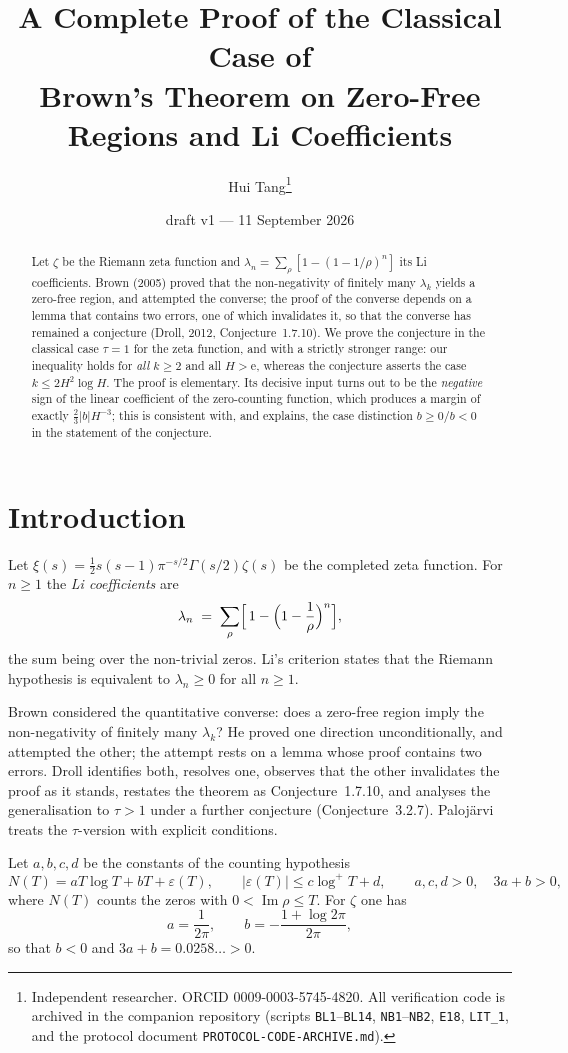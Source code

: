 \documentclass[11pt]{article}
\title{A Complete Proof of the Classical Case of\\ Brown's Theorem on Zero-Free Regions and Li Coefficients}
\author{Hui Tang\thanks{Independent researcher. ORCID 0009-0003-5745-4820. All verification code is archived
in the companion repository (scripts \texttt{BL1}--\texttt{BL14}, \texttt{NB1}--\texttt{NB2},
\texttt{E18}, \texttt{LIT\_1}, and the protocol document \texttt{PROTOCOL-CODE-ARCHIVE.md}).}}
\date{draft v1 --- 11 September 2026}
\theoremstyle{definition}
\newcommand{\e}{\mathrm{e}}
\DeclareMathOperator{\Imag}{Im}
\begin{document}
\maketitle

\begin{abstract}
Let $\zeta$ be the Riemann zeta function and $\lambda_n=\sum_\rho[1-(1-1/\rho)^n]$ its Li coefficients.
Brown (2005) proved that the non-negativity of finitely many $\lambda_k$ yields a zero-free region, and
attempted the converse; the proof of the converse depends on a lemma that contains two errors, one of
which invalidates it, so that the converse has remained a conjecture (Droll, 2012, Conjecture~1.7.10).
We prove the conjecture in the classical case $\tau=1$ for the zeta function, and with a strictly
stronger range: our inequality holds for \emph{all} $k\ge 2$ and all $H>\e$, whereas the conjecture
asserts the case $k\le 2H^2\log H$. The proof is elementary. Its decisive input turns out to be the
\emph{negative} sign of the linear coefficient of the zero-counting function, which produces a margin
of exactly $\tfrac23|b|H^{-3}$; this is consistent with, and explains, the case distinction
$b\ge0$/$b<0$ in the statement of the conjecture.
\end{abstract}

\section{Introduction}
Let $\xi(s)=\tfrac12 s(s-1)\pi^{-s/2}\Gamma(s/2)\zeta(s)$ be the completed zeta function. For $n\ge1$ the
\emph{Li coefficients} are
\[
\lambda_n \;=\; \sum_{\rho}\Bigl[\,1-\Bigl(1-\frac1\rho\Bigr)^{n}\Bigr],
\]
the sum being over the non-trivial zeros. Li's criterion \cite{Li97} states that the Riemann hypothesis
is equivalent to $\lambda_n\ge0$ for all $n\ge1$.

Brown \cite{Br05} considered the quantitative converse: does a zero-free region imply the
non-negativity of finitely many $\lambda_k$? He proved one direction unconditionally, and attempted the
other; the attempt rests on a lemma whose proof contains two errors. Droll \cite{Dr12} identifies both,
resolves one, observes that the other invalidates the proof as it stands, restates the theorem as
Conjecture~1.7.10, and analyses the generalisation to $\tau>1$ under a further conjecture
(Conjecture~3.2.7). Palojärvi \cite{Pa19} treats the $\tau$-version with explicit conditions.

Let $a,b,c,d$ be the constants of the counting hypothesis
\begin{equation}\label{eq:H}
N(T)=aT\log T+bT+\varepsilon(T),\qquad |\varepsilon(T)|\le c\log^{+}T+d,\qquad a,c,d>0,\quad 3a+b>0,
\end{equation}
where $N(T)$ counts the zeros with $0<\Imag\rho\le T$. For $\zeta$ one has
\begin{equation}\label{eq:const}
a=\frac1{2\pi},\qquad b=-\frac{1+\log 2\pi}{2\pi},
\end{equation}
so that $b<0$ and $3a+b=0.0258\ldots>0$.
\end{document}
